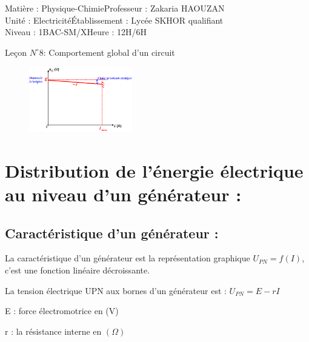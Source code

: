 \documentclass[12pt]{article}
\author{Zakaria HAOUZAN}
\date{\today}
\newcommand\headerMe[2]{\noindent{}#1\hfill#2}
\begin{document}
\headerMe{Matière : Physique-Chimie}{Professeur : Zakaria HAOUZAN}\\
\headerMe{Unité : Electricité}{Établissement : Lycée SKHOR qualifiant}\\
\headerMe{Niveau : 1BAC-SM/X}{Heure : 12H/6H}\\




\begin{center}

    \Large{Leçon $N^{\circ} 8 $: \color{red}Comportement global d’un circuit }
\end{center}

\begin{figure}
  \vspace{-1cm}
    \includegraphics[width=0.4\textwidth]{./img/img_00.png}
\end{figure}
  \section{Distribution de l’énergie électrique au niveau d’un générateur :}
\subsection{Caractéristique d’un générateur : }
  La caractéristique d’un générateur est la représentation graphique $U_{PN} = f(I)$, c’est une fonction linéaire décroissante.

  La tension électrique UPN aux bornes d’un générateur est : $U_{PN} = E-rI$
  
  E : force électromotrice en (V)

  r : la résistance interne en $(\Omega)$
\end{document}
